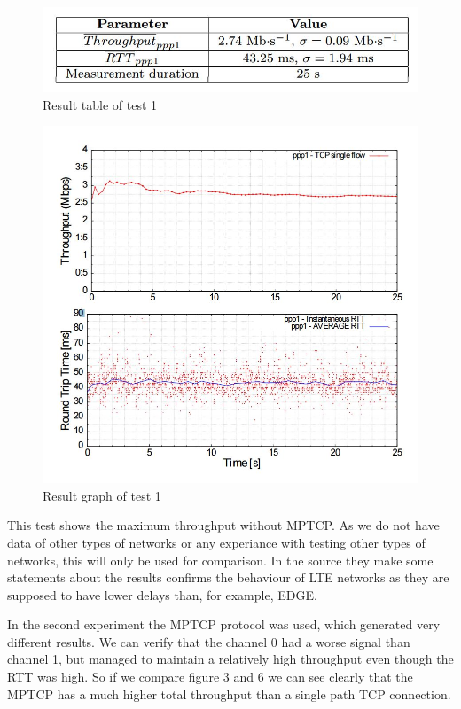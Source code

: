 \documentclass[11pt,twocolumn]{article}
\begin{document}
\begin{figure}[ht]
\begin{center}
\includegraphics[scale=0.5]{table_1}
\caption{Result table of test 1}
\end{center}
\end{figure}
\begin{figure}[ht]
\begin{center}
\includegraphics[scale=0.5]{graph_1}
\caption{Result graph of test 1}
\end{center}
\end{figure}

This test shows the maximum throughput without MPTCP. As we do not have data of other types of networks or any experiance with testing other types of networks, this will only be used for comparison. In the source they make some statements about the results confirms the behaviour of LTE networks as they are supposed to have lower delays than, for example, EDGE. 

In the second experiment the MPTCP protocol was used, which generated very different results. We can verify that the channel 0 had a worse signal than channel 1, but managed to maintain a relatively high throughput even though the RTT was high. So if we compare figure 3 and 6 we can see clearly that the MPTCP has a much higher total throughput than a single path TCP connection.
\end{document}
